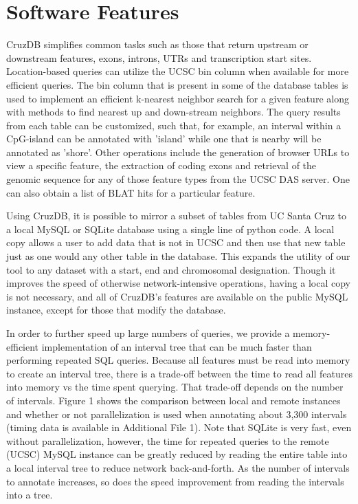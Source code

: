 \documentclass[10pt]{bmc_article}
\newenvironment{bmcformat}{\baselineskip20pt\sloppy\setboolean{publ}{false}}{\baselineskip20pt\sloppy}
\begin{document}
\begin{bmcformat}
\section*{Software Features}
CruzDB simplifies common tasks such as those that return upstream or downstream features, exons, introns, UTRs and transcription start sites. Location-based queries can utilize the UCSC bin column \cite{KentBrowser} when available for more efficient queries. The bin column that is present in some of the database tables is used to implement an efficient k-nearest neighbor search for a given feature along with methods to find nearest up and down-stream neighbors. The query results from each table can be customized, such that, for example, an interval within a CpG-island can be annotated with 'island' while one that is nearby will be annotated as 'shore'. Other operations include the generation of browser URLs to view a specific feature, the extraction of coding exons and retrieval of the genomic sequence for any of those feature types from the UCSC DAS server. One can also obtain a list of BLAT \cite{KentBLAT} hits for a particular feature.

Using CruzDB, it is possible to mirror a subset of tables from UC Santa Cruz to a local MySQL or SQLite database using a single line of python code. A local copy allows a user to add data that is not in UCSC and then use that new table just as one would any other table in the database. This expands the utility of our tool to any dataset with a start, end and chromosomal designation. Though it improves the speed of otherwise network-intensive operations, having a local copy is not necessary, and all of CruzDB's features are available on the public MySQL instance, except for those that modify the database.

In order to further speed up large numbers of queries, we provide a memory-efficient implementation of an interval tree that can be much faster than performing repeated SQL queries. Because all features must be read into memory to create an interval tree, there is a trade-off between the time to read all features into memory vs the time spent querying. That trade-off depends on the number of intervals. Figure 1 shows the comparison between local and remote instances and whether or not parallelization is used when annotating about 3,300 intervals (timing data is available in Additional File 1). Note that SQLite is very fast, even without parallelization, however, the time for repeated queries to the remote (UCSC) MySQL instance can be greatly reduced by reading the entire table into a local interval tree to reduce network back-and-forth. As the number of intervals to annotate increases, so does the speed improvement from reading the intervals into a tree.


\end{bmcformat}
\end{document}
